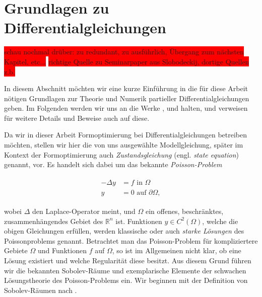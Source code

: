 
\section{Grundlagen zu Differentialgleichungen}



\colorbox{red}{schau nochmal drüber: zu redundant, zu ausführlich, Übergang zum nächsten Kapitel, etc...}
\colorbox{red}{richtige Quelle zu Seminarpaper aus Slobodeckij, dortige Quellen z.b.}

In diesem Abschnitt möchten wir eine kurze Einführung in die für diese Arbeit nötigen Grundlagen zur Theorie und Numerik partieller Differentialgleichungen geben. Im Folgenden werden wir uns an die Werke \cite{PDE1}, \cite{PDE2} und \cite{PDE3} halten, und verweisen für weitere Details und Beweise auch auf diese.

Da wir in dieser Arbeit Formoptimierung bei Differentialgleichungen betreiben möchten, stellen wir hier die von uns ausgewählte Modellgleichung, später im Kontext der Formoptimierung auch \textit{Zustandsgleichung} (engl. \textit{state equation}) genannt, vor. Es handelt sich dabei um das bekannte \textit{Poisson-Problem}

\begin{align}\label{Poissonproblem}
	\begin{aligned}
	-\Delta y &=  f  \text{ in } \Omega \; \\ y &= 0 \text{ auf } \partial \Omega,
	\end{aligned}
\end{align}

wobei $\Delta$ den Laplace-Operator meint, und $\Omega$ ein offenes, beschränktes, zusammenhängendes Gebiet des $\mathbb{R}^n$ ist. Funktionen $y\in C^2(\Omega)$, welche die obigen Gleichungen erfüllen, werden klassische oder auch \textit{starke Lösungen} des Poissonproblems genannt. Betrachtet man das Poisson-Problem für kompliziertere Gebiete $\Omega$ und Funktionen $f$ auf $\Omega$, so ist im Allgemeinen nicht klar, ob eine Lösung existiert und welche Regularität diese besitzt. Aus diesem Grund führen wir die bekannten Sobolev-Räume und exemplarische Elemente der schwachen Lösungstheorie des Poisson-Problems ein. Wir beginnen mit der Definition von Sobolev-Räumen nach \cite{PDE3}.

